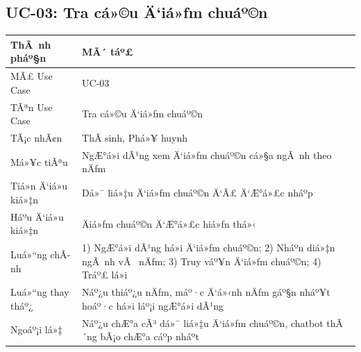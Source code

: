 ﻿\documentclass[12pt,a4paper]{report}
\begin{document}
\subsection{UC-03: Tra cá»©u Ä‘iá»ƒm chuáº©n}
\begin{table}[H]
\centering
\begin{tabular}{|p{3.5cm}|p{8.5cm}|}
\hline
\textbf{ThÃ nh pháº§n} & \textbf{MÃ´ táº£} \\ \hline
MÃ£ Use Case & UC-03 \\ \hline
TÃªn Use Case & Tra cá»©u Ä‘iá»ƒm chuáº©n \\ \hline
TÃ¡c nhÃ¢n & ThÃ­ sinh, Phá»¥ huynh \\ \hline
Má»¥c tiÃªu & NgÆ°á»i dÃ¹ng xem Ä‘iá»ƒm chuáº©n cá»§a ngÃ nh theo nÄƒm \\ \hline
Tiá»n Ä‘iá»u kiá»‡n & Dá»¯ liá»‡u Ä‘iá»ƒm chuáº©n Ä‘Ã£ Ä‘Æ°á»£c nháº­p \\ \hline
Háº­u Ä‘iá»u kiá»‡n & Äiá»ƒm chuáº©n Ä‘Æ°á»£c hiá»ƒn thá»‹ \\ \hline
Luá»“ng chÃ­nh & 1) NgÆ°á»i dÃ¹ng há»i Ä‘iá»ƒm chuáº©n; 2) Nháº­n diá»‡n ngÃ nh vÃ  nÄƒm; 3) Truy váº¥n Ä‘iá»ƒm chuáº©n; 4) Tráº£ lá»i \\ \hline
Luá»“ng thay tháº¿ & Náº¿u thiáº¿u nÄƒm, máº·c Ä‘á»‹nh nÄƒm gáº§n nháº¥t hoáº·c há»i láº¡i ngÆ°á»i dÃ¹ng \\ \hline
Ngoáº¡i lá»‡ & Náº¿u chÆ°a cÃ³ dá»¯ liá»‡u Ä‘iá»ƒm chuáº©n, chatbot thÃ´ng bÃ¡o chÆ°a cáº­p nháº­t \\ \hline
\end{tabular}
\end{table}
\end{document}
